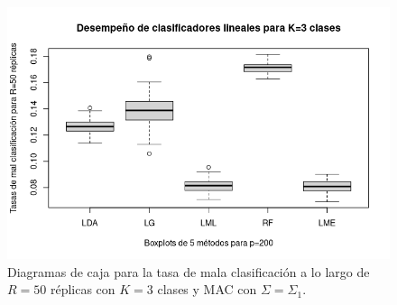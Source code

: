 \documentclass{report}
\begin{document}
\begin{figure} [h]
\begin{multicols}{2}
  		\caption*{$p=100$}
  		\includegraphics[width=\linewidth]{3_clases_p200_sigma_II}\par 
  		\caption*{$p=200$}
  		
  	\end{multicols}
  	\caption{ Diagramas de caja para la tasa de mala clasificación  a lo largo de $R=50$ réplicas con $K=3$ clases y MAC con $\Sigma=\Sigma_1$. }
  	\label{boxk3alta}
  \end{figure}
  
\end{document}
